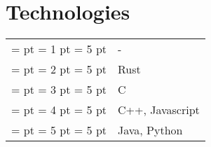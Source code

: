 \documentclass [a4paper,10pt]{article}
\newcommand{\gradelong}[6]{%
    \pgfmathtruncatemacro\floored{#1}%
    \pgfmathsetmacro\diff{#1-\floored}%
    \newdimen\diffDim%
    \diffDim = \diff pt%
    \newdimen\numPointsDim
    \numPointsDim = #1 pt
    \newdimen\maxPointsDim%
    \maxPointsDim = #2 pt%
    \begin{tikzpicture}
        \foreach \x in {1, ..., #2}{
            \ifnum \x > \floored \relax%
                \def\fillCol{#6}%
            \else%
                \def\fillCol{#5}%
            \fi%
            \fill[\fillCol] (#3*\x, 0) circle (#4);
        }%
        \ifdim \diffDim > 0 pt \relax%
            \ifdim \numPointsDim > \maxPointsDim \relax%
            \else%
                \pgfmathsetmacro\pos{#3*(\floored+1)}%
                \begin{scope}[xshift=\pos]
                    \clip (-#4,-#4) rectangle ++(#4*2*\diff,#4*2);
                    \fill[#5] (0, 0) circle (#4);
                \end{scope}
            \fi%
        \else%
        \fi%
    \end{tikzpicture}%
}
\newcommand{\grade}[1]{%
    \gradelong%
    {#1}%
    {5}%
    {9pt}%
    {3pt}%
    {frontColor}%
    {backColor}%
}
\begin{document}
\section{Technologies}
\begin{tabular}{r p{11cm}}
\\
        \grade{1} & -\\
        \grade{2} & Rust\\
        \grade{3} & C\\
        \grade{4} & C++, Javascript \\
        \grade{5}  & Java, Python\\
\end{tabular}
\end{document}
